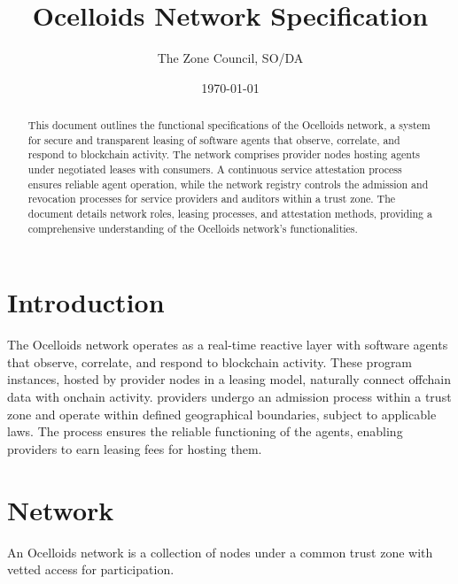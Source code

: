 \documentclass{oc}
\begin{document}
\title{Ocelloids Network Specification}
\author{The Zone Council, SO/DA}
\date{\today}
\maketitle


\begin{abstract}
This document outlines the functional specifications of the Ocelloids network, a system for secure and transparent leasing of software agents that observe, correlate, and respond to blockchain activity.
The network comprises provider nodes hosting agents under negotiated leases with consumers.
A continuous service attestation process ensures reliable agent operation, while the network registry controls the admission and revocation processes for service providers and auditors within a trust zone.
The document details network roles, leasing processes, and attestation methods, providing a comprehensive understanding of the Ocelloids network's functionalities.
\end{abstract}


\newpage

\section{Introduction}\label{sec:introduction}

The Ocelloids network operates as a real-time reactive layer with software \glspl*{agent} that observe, correlate, and respond to blockchain activity.
These \gls*{program} instances, hosted by \gls*{provider} nodes in a leasing model, naturally connect offchain data with onchain activity.
\Glspl*{provider} undergo an admission process within a trust zone and operate within defined geographical boundaries, subject to applicable laws.
The  process ensures the reliable functioning of the \glspl*{agent}, enabling \glspl*{provider} to earn leasing fees for hosting them.

\section{Network}

An Ocelloids network is a collection of nodes under a common trust zone with vetted access for participation.
\end{document}
